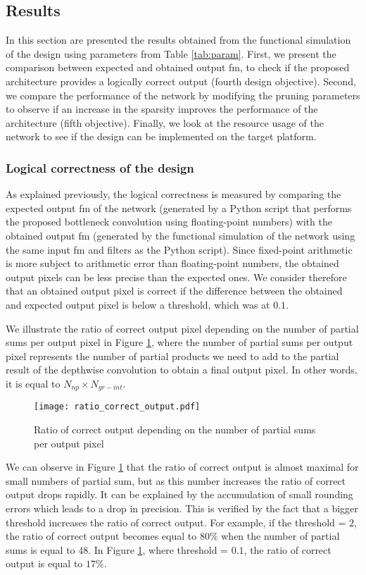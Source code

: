 \subsection{Results} \label{subs:res}
In this section are presented the results obtained from the functional simulation of the design using parameters from Table \ref{tab:param}. First, we present the comparison between expected and obtained output \acrshort{fm}, to check if the proposed architecture provides a logically correct output (fourth design objective). Second, we compare the performance of the network by modifying the pruning parameters to observe if an increase in the sparsity improves the performance of the architecture (fifth objective). Finally, we look at the resource usage of the network to see if the design can be implemented on the target platform.
%
\subsubsection{Logical correctness of the design}
%
As explained previously, the logical correctness is measured by comparing the expected output \acrshort{fm} of the network (generated by a Python script that performs the proposed bottleneck convolution using floating-point numbers) with the obtained output \acrshort{fm} (generated by the functional simulation of the network using the same input \acrshort{fm} and filters as the Python script). Since fixed-point arithmetic is more subject to arithmetic error than floating-point numbers, the obtained output pixels can be less precise than the expected ones. We consider therefore that an obtained output pixel is correct if the difference between the obtained and expected output pixel is below a threshold, which was at $0.1$.

We illustrate the ratio of correct output pixel depending on the number of partial sums per output pixel in Figure \ref{fig:res-output}, where the number of partial sums per output pixel represents the number of partial products we need to add to the partial result of the depthwise convolution to obtain a final output pixel. In other words, it is equal to $N_{np} \times N_{gr-int}$.
%
\begin{figure}[H]
    \centering
    \texttt{[image: ratio\_correct\_output.pdf]}
    \caption{Ratio of correct output depending on the number of partial sums per output pixel}
    \label{fig:res-output}
\end{figure}

We can observe in Figure \ref{fig:res-output} that the ratio of correct output is almost maximal for small numbers of partial sum, but as this number increases the ratio of correct output drops rapidly. It can be explained by the accumulation of small rounding errors which leads to a drop in precision. This is verified by the fact that a bigger threshold increases the ratio of correct output. For example, if the threshold = $2$, the ratio of correct output becomes equal to $80\%$ when the number of partial sums is equal to $48$. In Figure \ref{fig:res-output}, where threshold = $0.1$, the ratio of correct output is equal to $17\%$.
%
